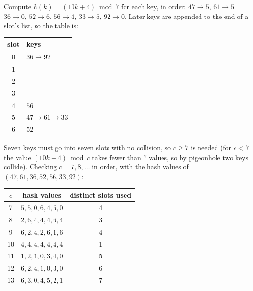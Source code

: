 \documentclass[12pt,twoside]{article}
\begin{document}


\begin{problems}

\problem  %

\begin{problemparts}
\problempart %
Compute $h(k)=(10k+4)\bmod 7$ for each key, in order:
$47\to 5$, $61\to 5$, $36\to 0$, $52\to 6$, $56\to 4$, $33\to 5$, $92\to 0$.
Later keys are appended to the end of a slot's list, so the table is:

\begin{center}
\begin{tabular}{c|l}
slot & keys \\ \hline
0 & $36 \to 92$ \\
1 & \\
2 & \\
3 & \\
4 & $56$ \\
5 & $47 \to 61 \to 33$ \\
6 & $52$
\end{tabular}
\end{center}

\problempart %
Seven keys must go into seven slots with no collision, so $c\ge 7$ is needed (for $c<7$ the value
$(10k+4)\bmod c$ takes fewer than 7 values, so by pigeonhole two keys collide). Checking
$c=7,8,\dots$ in order, with the hash values of $(47,61,36,52,56,33,92)$:

\begin{center}
\begin{tabular}{c|c|c}
$c$ & hash values & distinct slots used \\ \hline
7 & $5,5,0,6,4,5,0$ & 4 \\
8 & $2,6,4,4,4,6,4$ & 3 \\
9 & $6,2,4,2,6,1,6$ & 4 \\
10 & $4,4,4,4,4,4,4$ & 1 \\
11 & $1,2,1,0,3,4,0$ & 5 \\
12 & $6,2,4,1,0,3,0$ & 6 \\
13 & $6,3,0,4,5,2,1$ & 7
\end{tabular}
\end{center}


\end{problemparts}
\end{problems}
\end{document}
